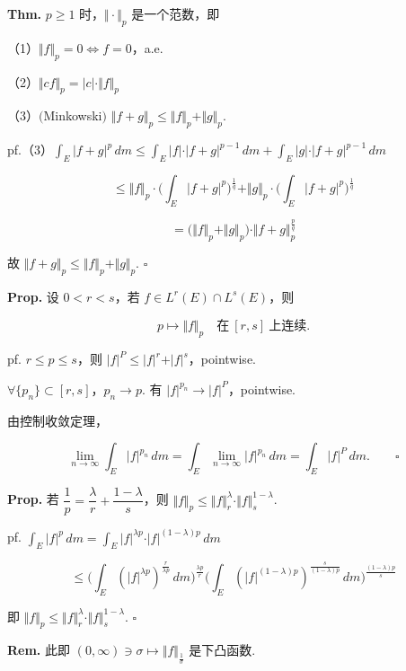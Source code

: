 \documentclass[11pt]{ctexart}
\theoremstyle{definition}
\begin{document}
\textbf{Thm.} $p \geq 1$ 时，$\Vert \cdot \Vert_p$ 是一个范数，即

（1）$\Vert f\Vert_p = 0 \iff f = 0$，a.e.

（2）$\Vert cf\Vert_p = \vert c\vert \cdot \Vert f\Vert_p$

（3）$($Minkowski$)$ $\Vert f + g\Vert_p \leq \Vert f\Vert_p + \Vert g\Vert_p$.

pf.（3）$\displaystyle\int_E \vert f + g\vert^p \, dm \leq \int_E \vert f\vert \cdot \vert f + g\vert^{p-1} \, dm + \int_E \vert g\vert \cdot \vert f + g\vert^{p-1} \, dm$

\[
\leq \Vert f\Vert_p \cdot \Big( \int_E \vert f + g\vert^p \Big)^{\frac{1}{q}} + \Vert g\Vert_p \cdot \Big( \int_E \vert f + g\vert^p \Big)^{\frac{1}{q}}
\]

\[
= \big( \Vert f\Vert_p + \Vert g\Vert_p \big) \cdot \Vert f + g\Vert_p^{\frac{p}{q}}
\]

故 $\Vert f + g\Vert_p \leq \Vert f\Vert_p + \Vert g\Vert_p$. $\square$

\textbf{Prop.} 设 $0 < r < s$，若 $f \in L^r(E) \cap L^s(E)$，则

\[
p \mapsto \Vert f\Vert_p \quad \text{在}\ [r, s]\ \text{上连续}.
\]

pf. $r \leq p \leq s$，则 $\vert f\vert^P \leq \vert f\vert^r + \vert f\vert^s$，pointwise.

$\forall \{p_n\} \subset [r, s]$，$p_n \to p$. 有 $\vert f\vert^{p_n} \to \vert f\vert^P$，pointwise.

由控制收敛定理，

\[
\lim_{n \to \infty} \int_E \vert f\vert^{p_n} \, dm = \int_E \lim_{n \to \infty} \vert f\vert^{p_n} \, dm = \int_E \vert f\vert^P \, dm. \qquad \square
\]

\textbf{Prop.} 若 $\dfrac{1}{p} = \dfrac{\lambda}{r} + \dfrac{1-\lambda}{s}$，则 $\Vert f\Vert_p \leq \Vert f\Vert_r^{\lambda} \cdot \Vert f\Vert_s^{1-\lambda}$.

pf. $\displaystyle\int_E \vert f\vert^p \, dm = \int_E \vert f\vert^{\lambda p} \cdot \vert f\vert^{(1-\lambda)p} \, dm$

\[
\leq \Big( \int_E (\vert f\vert^{\lambda p})^{\frac{r}{\lambda p}} \, dm \Big)^{\frac{\lambda p}{r}} \Big( \int_E (\vert f\vert^{(1-\lambda)p})^{\frac{s}{(1-\lambda)p}} \, dm \Big)^{\frac{(1-\lambda)p}{s}}
\]

即 $\Vert f\Vert_p \leq \Vert f\Vert_r^{\lambda} \cdot \Vert f\Vert_s^{1-\lambda}$. $\square$

\textbf{Rem.} 此即 $(0, \infty) \ni \sigma \mapsto \Vert f\Vert_{\frac{1}{\sigma}}$ 是下凸函数.
\end{document}
